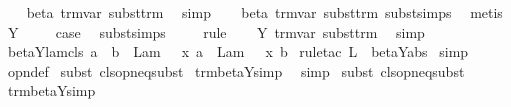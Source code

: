 \begin{isabellebody}
\isanewline
\ \ \isamarkupfalse%
\ beta\ trm{\isachardot}var\ subst{\isacharunderscore}trm\ \isamarkupfalse%
\ simp\isanewline
\ \ \isamarkupfalse%
\ beta{\isacharparenleft}{}{\isacharparenright}\ trm{\isachardot}var\ subst{\isacharunderscore}trm\ subst{\isachardot}simps{\isacharparenleft}{}{\isacharparenright}\ \isamarkupfalse%
\ metis\isanewline
{}\isamarkupfalse%
\isanewline
{}\isamarkupfalse%
\ Y\ \isanewline
\ \ \isamarkupfalse%
\ {\isacharquery}case\ \isamarkupfalse%
\ subst{\isachardot}simps\ \isanewline
\ \ \isamarkupfalse%
\ rule\isanewline
\ \ \isamarkupfalse%
\ Y\ trm{\isachardot}var\ subst{\isacharunderscore}trm\ \isamarkupfalse%
\ simp\isanewline
{}\isamarkupfalse%
%
\endisatagproof
{\isafoldproof}%
%
\isadelimproof
\isanewline
%
\endisadelimproof
\isanewline
{}\isamarkupfalse%
\ beta{\isacharunderscore}Y{\isacharunderscore}lam{\isacharunderscore}cls{\isacharcolon}\ {\isachardoublequoteopen}a\ {\isasymRightarrow}\ b\ {\isasymLongrightarrow}\ Lam\ {\isacharbraceleft}{}\ {\isacharless}{\isacharminus}\ x{\isacharbraceright}\ a\ {\isasymRightarrow}\ Lam\ {\isacharbraceleft}{}\ {\isacharless}{\isacharminus}\ x{\isacharbraceright}\ b{\isachardoublequoteclose}\isanewline
%
\isadelimproof
%
\endisadelimproof
%
\isatagproof
{}\isamarkupfalse%
\ {\isacharparenleft}rule{\isacharunderscore}tac\ L{\isacharequal}{\isachardoublequoteopen}{\isacharbraceleft}{\isacharbraceright}{\isachardoublequoteclose}\ \ beta{\isacharunderscore}Y{\isachardot}abs{\isacharparenright}\isanewline
{}\isamarkupfalse%
\ simp\isanewline
{}\isamarkupfalse%
\ opn{\isacharprime}{\isacharunderscore}def\isanewline
{}\isamarkupfalse%
\isanewline
{}\isamarkupfalse%
\ {\isacharparenleft}subst{\isacharparenleft}{}{\isacharparenright}\ cls{\isacharunderscore}opn{\isacharunderscore}eq{\isacharunderscore}subst{\isacharparenright}\isanewline
{}\isamarkupfalse%
\ trm{\isacharunderscore}beta{\isacharunderscore}Y{\isacharunderscore}simp{}\ \isamarkupfalse%
\ simp\isanewline
{}\isamarkupfalse%
\ {\isacharparenleft}subst\ cls{\isacharunderscore}opn{\isacharunderscore}eq{\isacharunderscore}subst{\isacharparenright}\isanewline
{}\isamarkupfalse%
\ trm{\isacharunderscore}beta{\isacharunderscore}Y{\isacharunderscore}simp{}\ \isamarkupfalse%

\end{isabellebody}
